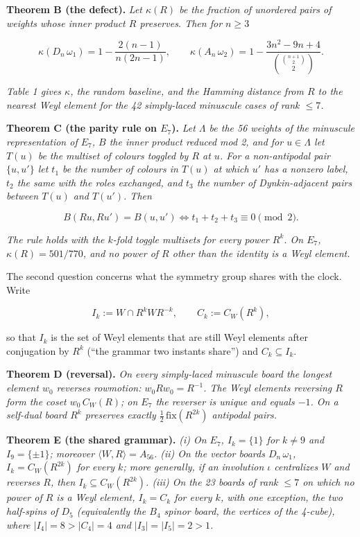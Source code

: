 \documentclass[
]{article}
\begin{document}
\textbf{Theorem B (the defect).} \emph{Let \(\kappa(R)\) be the fraction
of unordered pairs of weights whose inner product \(R\) preserves. Then
for \(n \ge 3\)}

\[\kappa(D_n\,\omega_1) = 1 - \frac{2(n-1)}{n(2n-1)}, \qquad \kappa(A_n\,\omega_2) = 1 - \frac{3n^2-9n+4}{\binom{\binom{n+1}{2}}{2}} .\]

\emph{Table 1 gives \(\kappa\), the random baseline, and the Hamming
distance from \(R\) to the nearest Weyl element for the 42 simply-laced
minuscule cases of rank \(\le 7\).}

\textbf{Theorem C (the parity rule on \(E_7\)).} \emph{Let \(\Lambda\)
be the 56 weights of the minuscule representation of \(E_7\), \(B\) the
inner product reduced mod 2, and for \(u \in \Lambda\) let \(T(u)\) be
the multiset of colours toggled by \(R\) at \(u\). For a non-antipodal
pair \(\{u,u'\}\) let \(t_1\) be the number of colours in \(T(u)\) at
which \(u'\) has a nonzero label, \(t_2\) the same with the roles
exchanged, and \(t_3\) the number of Dynkin-adjacent pairs between
\(T(u)\) and \(T(u')\). Then}

\[B(Ru, Ru') = B(u,u') \iff t_1 + t_2 + t_3 \equiv 0 \pmod 2 .\]

\emph{The rule holds with the \(k\)-fold toggle multisets for every
power \(R^k\). On \(E_7\), \(\kappa(R) = 501/770\), and no power of
\(R\) other than the identity is a Weyl element.}

The second question concerns what the symmetry group shares with the
clock. Write

\[I_k := W \cap R^k W R^{-k}, \qquad C_k := C_W(R^k),\]

so that \(I_k\) is the set of Weyl elements that are still Weyl elements
after conjugation by \(R^k\) (``the grammar two instants share'') and
\(C_k \subseteq I_k\).

\textbf{Theorem D (reversal).} \emph{On every simply-laced minuscule
board the longest element \(w_0\) reverses rowmotion:
\(w_0 R w_0 = R^{-1}\). The Weyl elements reversing \(R\) form the coset
\(w_0\,C_W(R)\); on \(E_7\) the reverser is unique and equals \(-1\). On
a self-dual board \(R^k\) preserves exactly
\(\tfrac12\,\mathrm{fix}(R^{2k})\) antipodal pairs.}

\textbf{Theorem E (the shared grammar).} \emph{(i) On \(E_7\),
\(I_k = \{1\}\) for \(k \ne 9\) and \(I_9 = \{\pm 1\}\); moreover
\(\langle W, R \rangle = A_{56}\). (ii) On the vector boards
\(D_n\,\omega_1\), \(I_k = C_W(R^{2k})\) for every \(k\); more
generally, if an involution \(\iota\) centralizes \(W\) and reverses
\(R\), then \(I_k \subseteq C_W(R^{2k})\). (iii) On the 23 boards of
rank \(\le 7\) on which no power of \(R\) is a Weyl element,
\(I_k = C_k\) for every \(k\), with one exception, the two half-spins of
\(D_5\) (equivalently the \(B_4\) spinor board, the vertices of the
4-cube), where \(|I_4| = 8 > |C_4| = 4\) and \(|I_3| = |I_5| = 2 > 1\).}
\end{document}
